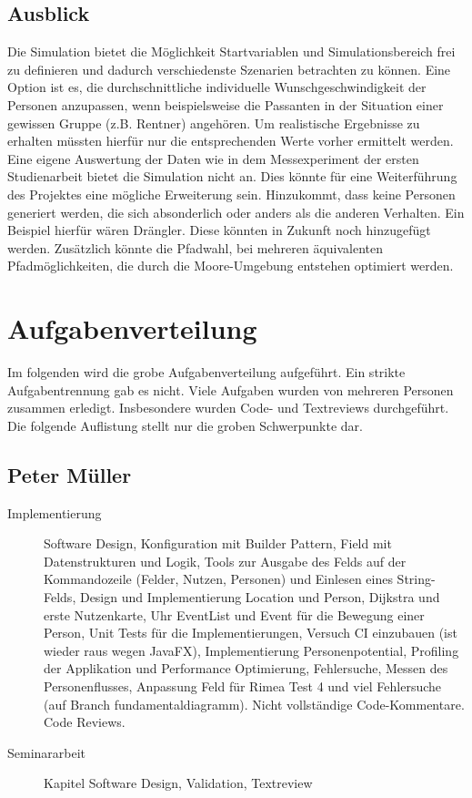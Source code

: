 \subsection{Ausblick}
Die Simulation bietet die Möglichkeit Startvariablen und Simulationsbereich frei zu definieren und dadurch verschiedenste Szenarien betrachten zu können. Eine Option ist es, die durchschnittliche individuelle Wunschgeschwindigkeit der Personen anzupassen, wenn beispielsweise die Passanten in der Situation einer gewissen Gruppe (z.B. Rentner) angehören. Um realistische Ergebnisse zu erhalten müssten hierfür nur die entsprechenden Werte vorher ermittelt werden. Eine eigene Auswertung der Daten wie in dem Messexperiment der ersten Studienarbeit bietet die Simulation nicht an. Dies könnte für eine Weiterführung des Projektes eine mögliche Erweiterung sein. Hinzukommt, dass keine Personen generiert werden, die sich absonderlich oder anders als die anderen Verhalten. Ein Beispiel hierfür wären Drängler. Diese könnten in Zukunft noch hinzugefügt werden. Zusätzlich könnte die Pfadwahl, bei mehreren äquivalenten Pfadmöglichkeiten, die durch die Moore-Umgebung entstehen optimiert werden.

\section{Aufgabenverteilung}
Im folgenden wird die grobe Aufgabenverteilung aufgeführt. Ein strikte Aufgabentrennung gab es nicht. Viele Aufgaben wurden von mehreren Personen zusammen erledigt. Insbesondere wurden Code- und Textreviews durchgeführt. Die folgende Auflistung stellt nur die groben Schwerpunkte dar.

\subsection{Peter Müller}
\begin{description}
\item[Implementierung]

Software Design, Konfiguration mit Builder Pattern, Field mit Datenstrukturen und Logik, Tools zur Ausgabe des Felds auf der Kommandozeile (Felder, Nutzen, Personen) und Einlesen eines String-Felds, Design und Implementierung Location und Person, Dijkstra und erste Nutzenkarte, Uhr EventList und Event für die Bewegung einer Person, Unit Tests für die Implementierungen, Versuch CI einzubauen (ist wieder raus wegen JavaFX), Implementierung Personenpotential, Profiling der Applikation und Performance Optimierung, Fehlersuche, Messen des Personenflusses, Anpassung Feld für Rimea Test 4 und viel Fehlersuche (auf Branch fundamentaldiagramm). Nicht vollständige Code-Kommentare. Code Reviews.

\item[Seminararbeit]

Kapitel Software Design, Validation, Textreview

\end{description}

